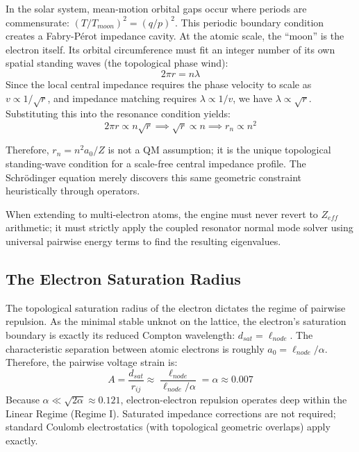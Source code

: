 In the solar system, mean-motion orbital gaps occur where periods are commensurate: $(T/T_{moon})^2 = (q/p)^2$. This periodic boundary condition creates a Fabry-Pérot impedance cavity. At the atomic scale, the ``moon'' is the electron itself. Its orbital circumference must fit an integer number of its own spatial standing waves (the topological phase wind):
\begin{equation}
    2\pi r = n \lambda
\end{equation}
Since the local central impedance requires the phase velocity to scale as $v \propto 1/\sqrt{r}$, and impedance matching requires $\lambda \propto 1/v$, we have $\lambda \propto \sqrt{r}$. Substituting this into the resonance condition yields:
\begin{equation}
    2\pi r \propto n \sqrt{r} \implies \sqrt{r} \propto n \implies r_n \propto n^2
\end{equation}

Therefore, $r_n = n^2 a_0 / Z$ is not a QM assumption; it is the unique topological standing-wave condition for a scale-free central impedance profile. The Schrödinger equation merely discovers this same geometric constraint heuristically through operators.

When extending to multi-electron atoms, the engine must never revert to $Z_{eff}$ arithmetic; it must strictly apply the coupled resonator normal mode solver using universal pairwise energy terms to find the resulting eigenvalues.

\subsection{The Electron Saturation Radius}
The topological saturation radius of the electron dictates the regime of pairwise repulsion. As the minimal stable unknot on the lattice, the electron's saturation boundary is exactly its reduced Compton wavelength: $d_{sat} = \ell_{node}$. The characteristic separation between atomic electrons is roughly $a_0 = \ell_{node}/\alpha$. Therefore, the pairwise voltage strain is:
\begin{equation}
    A = \frac{d_{sat}}{r_{ij}} \approx \frac{\ell_{node}}{\ell_{node}/\alpha} = \alpha \approx 0.007
\end{equation}
Because $\alpha \ll \sqrt{2\alpha} \approx 0.121$, electron-electron repulsion operates deep within the Linear Regime (Regime I). Saturated impedance corrections are not required; standard Coulomb electrostatics (with topological geometric overlaps) apply exactly.

